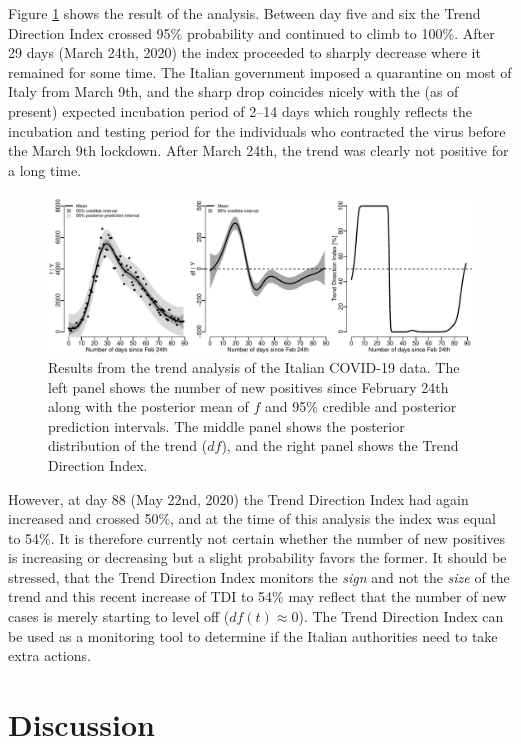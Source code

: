 \documentclass[
  11pt,
]{article}
\theoremstyle{nonumberplain}
\begin{document}
Figure \ref{fig:covid19Fit} shows the result of the analysis. Between
day five and six the Trend Direction Index crossed 95\% probability and
continued to climb to 100\%. After 29 days (March 24th, 2020) the index
proceeded to sharply decrease where it remained for some time. The
Italian government imposed a quarantine on most of Italy from March 9th,
and the sharp drop coincides nicely with the (as of present) expected
incubation period of 2--14 days which roughly reflects the incubation
and testing period for the individuals who contracted the virus before
the March 9th lockdown. After March 24th, the trend was clearly not
positive for a long time.

\begin{figure}[htb]
\center\includegraphics{covid19_gpFit.pdf}
\caption{Results from the trend analysis of the Italian COVID-19 data. The left panel shows the number of new positives since February 24th along with the posterior mean of $f$ and 95\% credible and posterior prediction intervals. The middle panel shows the posterior distribution of the trend ($df$), and the right panel shows the Trend Direction Index.}
\label{fig:covid19Fit}
\end{figure}

However, at day 88 (May 22nd, 2020) the Trend Direction Index had again
increased and crossed 50\%, and at the time of this analysis the index
was equal to 54\%. It is therefore currently not certain whether the
number of new positives is increasing or decreasing but a slight
probability favors the former. It should be stressed, that the Trend
Direction Index monitors the \emph{sign} and not the \emph{size} of the
trend and this recent increase of TDI to 54\% may reflect that the
number of new cases is merely starting to level off
(\(df(t) \approx 0\)). The Trend Direction Index can be used as a
monitoring tool to determine if the Italian authorities need to take
extra actions.

\hypertarget{sec:discussion}{%
\section{Discussion}\label{sec:discussion}}
\end{document}
